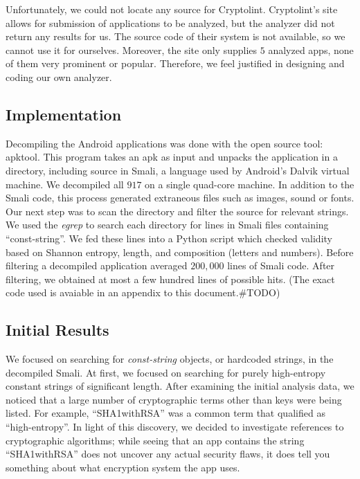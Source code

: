 \documentclass[11pt]{article}
\numberwithin{theorem}{subsection}
\begin{document}
Unfortunately, we could not locate any source for Cryptolint. Cryptolint's site allows for submission of
applications to be analyzed, but the analyzer did not return any results for us.  The source code of their
system is not available, so we cannot use it for ourselves.   Moreover, the site only supplies $5$ analyzed apps, 
none of them very prominent or popular. Therefore, we feel justified in designing and coding our own analyzer.

\subsection{Implementation}

  Decompiling the Android applications was done with the open source tool: apktool. This program takes
an apk as input and unpacks the application in a directory, including source in Smali, 
a language used by Android's Dalvik virtual machine.
We decompiled all $917$ on a single quad-core machine. In addition to the Smali code, this process generated extraneous files
such as images, sound or fonts. 
  Our next step was to scan the directory and filter the source for relevant strings. We used the \textit{egrep} to search
each directory for lines in Smali files containing ``const-string''. We fed these lines into a Python script
which checked validity based on Shannon entropy, length, and composition (letters and numbers). Before filtering a
decompiled application averaged $200,000$ lines of Smali code. After filtering, we obtained at most a few hundred lines
of possible hits.  (The exact code used is avaiable in an appendix to this document.\#TODO)

\subsection{Initial Results}

  We focused on searching for \textit{const-string} objects, or hardcoded strings, in the decompiled Smali.
At first, we focused on searching for purely high-entropy constant strings of significant length. 
After examining the initial analysis data, we noticed that a large number of cryptographic terms other than keys were being
listed. For example, ``SHA1withRSA'' was a common term that qualified as ``high-entropy''. In light of this discovery,
we decided to investigate references to cryptographic algorithms; while seeing that an app contains the string ``SHA1withRSA''
does not uncover any actual security flaws, it does tell you something about what encryption system the app uses.
\end{document}

